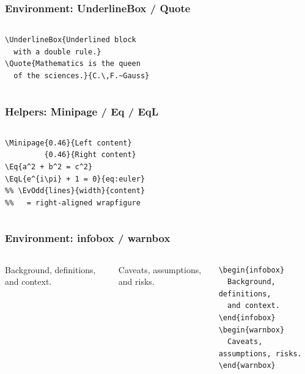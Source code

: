 \documentclass[aspectratio=169,10pt]{beamer}
\begin{document}
\begin{frame}[fragile]
    \frametitle{Environment: UnderlineBox / Quote}
    \scriptsize
    \begin{columns}[T]
        \vspace{1mm}
        \begin{lstlisting}[language={[LaTeX]TeX}]
\UnderlineBox{Underlined block
  with a double rule.}
\Quote{Mathematics is the queen
  of the sciences.}{C.\,F.~Gauss}
        \end{lstlisting}
    \end{columns}
\end{frame}

\begin{frame}[fragile]
    \frametitle{Helpers: Minipage / Eq / EqL}
    \scriptsize
    \begin{columns}[T]
        \vspace{2mm}
        \begin{lstlisting}[language={[LaTeX]TeX}]
\Minipage{0.46}{Left content}
         {0.46}{Right content}
\Eq{a^2 + b^2 = c^2}
\EqL{e^{i\pi} + 1 = 0}{eq:euler}
%% \EvOdd{lines}{width}{content}
%%   = right-aligned wrapfigure
        \end{lstlisting}
    \end{columns}
\end{frame}

\begin{frame}[fragile]
    \frametitle{Environment: infobox / warnbox}
    \scriptsize
    \begin{columns}[T]
        \begin{infobox}
            Background, definitions, and context.
        \end{infobox}
        \begin{warnbox}
            Caveats, assumptions, and risks.
        \end{warnbox}
        \begin{lstlisting}[language={[LaTeX]TeX}]
\begin{infobox}
  Background, definitions,
  and context.
\end{infobox}
\begin{warnbox}
  Caveats, assumptions, risks.
\end{warnbox}
        \end{lstlisting}
    \end{columns}
\end{frame}
\end{document}
